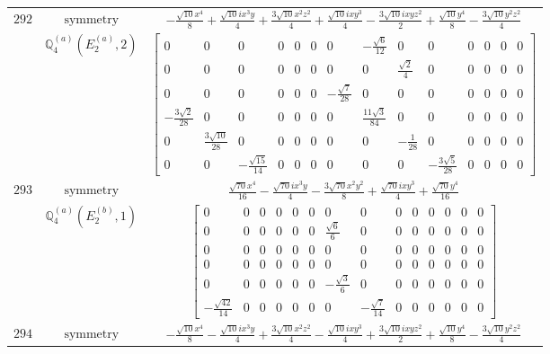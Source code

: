\documentclass[fleqn,8pt,landscape]{jsarticle}
\begin{document}
\begin{longtable}{ccc}
$ 292 $ & $ \text{symmetry} $ & $ - \frac{\sqrt{10} x^{4}}{8} + \frac{\sqrt{10} i x^{3} y}{4} + \frac{3 \sqrt{10} x^{2} z^{2}}{4} + \frac{\sqrt{10} i x y^{3}}{4} - \frac{3 \sqrt{10} i x y z^{2}}{2} + \frac{\sqrt{10} y^{4}}{8} - \frac{3 \sqrt{10} y^{2} z^{2}}{4} $ \\
$  $ & $ \mathbb{Q}_{4}^{(a)}(E_{2}^{(a)},2) $ & $ \begin{bmatrix} 0 & 0 & 0 & 0 & 0 & 0 & 0 & - \frac{\sqrt{6}}{12} & 0 & 0 & 0 & 0 & 0 & 0 \\ 0 & 0 & 0 & 0 & 0 & 0 & 0 & 0 & \frac{\sqrt{2}}{4} & 0 & 0 & 0 & 0 & 0 \\ 0 & 0 & 0 & 0 & 0 & 0 & - \frac{\sqrt{7}}{28} & 0 & 0 & 0 & 0 & 0 & 0 & 0 \\ - \frac{3 \sqrt{2}}{28} & 0 & 0 & 0 & 0 & 0 & 0 & \frac{11 \sqrt{3}}{84} & 0 & 0 & 0 & 0 & 0 & 0 \\ 0 & \frac{3 \sqrt{10}}{28} & 0 & 0 & 0 & 0 & 0 & 0 & - \frac{1}{28} & 0 & 0 & 0 & 0 & 0 \\ 0 & 0 & - \frac{\sqrt{15}}{14} & 0 & 0 & 0 & 0 & 0 & 0 & - \frac{3 \sqrt{5}}{28} & 0 & 0 & 0 & 0 \end{bmatrix} $ \\ \hline
$ 293 $ & $ \text{symmetry} $ & $ \frac{\sqrt{70} x^{4}}{16} - \frac{\sqrt{70} i x^{3} y}{4} - \frac{3 \sqrt{70} x^{2} y^{2}}{8} + \frac{\sqrt{70} i x y^{3}}{4} + \frac{\sqrt{70} y^{4}}{16} $ \\
$  $ & $ \mathbb{Q}_{4}^{(a)}(E_{2}^{(b)},1) $ & $ \begin{bmatrix} 0 & 0 & 0 & 0 & 0 & 0 & 0 & 0 & 0 & 0 & 0 & 0 & 0 & 0 \\ 0 & 0 & 0 & 0 & 0 & 0 & \frac{\sqrt{6}}{6} & 0 & 0 & 0 & 0 & 0 & 0 & 0 \\ 0 & 0 & 0 & 0 & 0 & 0 & 0 & 0 & 0 & 0 & 0 & 0 & 0 & 0 \\ 0 & 0 & 0 & 0 & 0 & 0 & 0 & 0 & 0 & 0 & 0 & 0 & 0 & 0 \\ 0 & 0 & 0 & 0 & 0 & 0 & - \frac{\sqrt{3}}{6} & 0 & 0 & 0 & 0 & 0 & 0 & 0 \\ - \frac{\sqrt{42}}{14} & 0 & 0 & 0 & 0 & 0 & 0 & - \frac{\sqrt{7}}{14} & 0 & 0 & 0 & 0 & 0 & 0 \end{bmatrix} $ \\ \hline
$ 294 $ & $ \text{symmetry} $ & $ - \frac{\sqrt{10} x^{4}}{8} - \frac{\sqrt{10} i x^{3} y}{4} + \frac{3 \sqrt{10} x^{2} z^{2}}{4} - \frac{\sqrt{10} i x y^{3}}{4} + \frac{3 \sqrt{10} i x y z^{2}}{2} + \frac{\sqrt{10} y^{4}}{8} - \frac{3 \sqrt{10} y^{2} z^{2}}{4} $ \\

\end{longtable}
\end{document}
